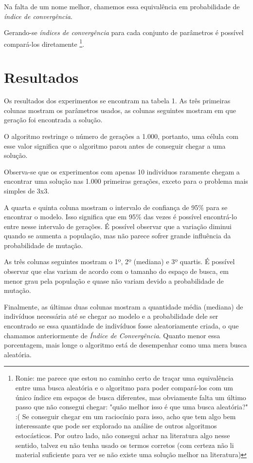 \documentclass{llncs}
\begin{document}
Na falta de um nome melhor, chamemos essa equivalência em probabilidade de \emph{índice de convergência}.

Gerando-se \emph{índices de convergência} para cada conjunto de parâmetros é possível compará-los diretamente \footnote{Ronie: me parece que estou no caminho certo de traçar uma equivalência entre uma busca aleatória e o algoritmo para poder compará-los com um único índice em espaços de busca diferentes, mas obviamente falta um último passo que não consegui chegar: "quão melhor isso é que uma busca aleatória?" :( Se conseguir chegar em um raciocínio para isso, acho que tem algo bem interessante que pode ser explorado na análise de outros algoritmos estocásticos. Por outro lado, não consegui achar na literatura algo nesse sentido, talvez eu não tenha usado os termos corretos (com certeza não li material suficiente para ver se não existe uma solução melhor na literatura)}.

%
\section{Resultados}
%
Os resultados dos experimentos se encontram na tabela 1. As três primeiras colunas mostram os parâmetros usados, as colunas seguintes mostram em que geração foi encontrada a solução.

O algoritmo restringe o número de gerações a 1.000, portanto, uma célula com esse valor significa que o algoritmo parou antes de conseguir chegar a uma solução.

Observa-se que os experimentos com apenas 10 individuos raramente chegam a encontrar uma solução nas 1.000 primeiras gerações, exceto para o problema mais simples de 3x3.

A quarta e quinta coluna mostram o intervalo de confiança de 95\% para se encontrar o modelo. Isso significa que em 95\% das vezes é possível encontrá-lo entre nesse intervalo de gerações. É possível observar que a variação diminui quando se aumenta a população, mas não parece sofrer grande influência da probabilidade de mutação.

As três colunas seguintes mostram o 1º, 2º (mediana) e 3º quartis. É possível observar que elas variam de acordo com o tamanho do espaço de busca, em menor grau pela população e quase não variam devido a probabilidade de mutação.

Finalmente, as últimas duas colunas mostram a quantidade média (mediana) de indivíduos necessária até se chegar ao modelo e a probabilidade dele ser encontrado se essa quantidade de indivíduos fosse aleatoriamente criada, o que chamamos anteriormente de \emph{Índice de Convergência}. Quanto menor essa porcentagem, mais longe o algoritmo está de desempenhar como uma mera busca aleatória.
\end{document}
